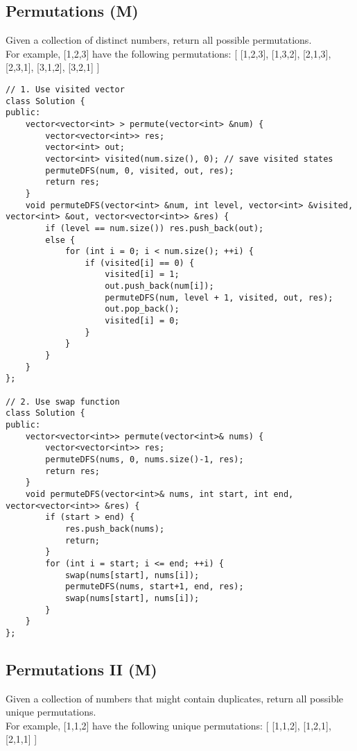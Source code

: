 \subsection{Permutations (M)}
Given a collection of distinct numbers, return all possible permutations. \\

For example,
[1,2,3] have the following permutations: [ [1,2,3], [1,3,2], [2,1,3], [2,3,1], [3,1,2], [3,2,1] ]\\

\begin{lstlisting}
// 1. Use visited vector
class Solution {
public:
    vector<vector<int> > permute(vector<int> &num) {
        vector<vector<int>> res;
        vector<int> out;
        vector<int> visited(num.size(), 0); // save visited states
        permuteDFS(num, 0, visited, out, res);
        return res;
    }
    void permuteDFS(vector<int> &num, int level, vector<int> &visited, vector<int> &out, vector<vector<int>> &res) {
        if (level == num.size()) res.push_back(out);
        else {
            for (int i = 0; i < num.size(); ++i) {
                if (visited[i] == 0) {
                    visited[i] = 1;
                    out.push_back(num[i]);
                    permuteDFS(num, level + 1, visited, out, res);
                    out.pop_back();
                    visited[i] = 0;
                }
            }
        }
    }
};

// 2. Use swap function
class Solution {
public:
    vector<vector<int>> permute(vector<int>& nums) {
        vector<vector<int>> res;
        permuteDFS(nums, 0, nums.size()-1, res);
        return res;
    }
    void permuteDFS(vector<int>& nums, int start, int end, vector<vector<int>> &res) {
        if (start > end) {
            res.push_back(nums);
            return;
        }
        for (int i = start; i <= end; ++i) {
            swap(nums[start], nums[i]);
            permuteDFS(nums, start+1, end, res);
            swap(nums[start], nums[i]);
        }
    }
};
\end{lstlisting}


\subsection{Permutations II (M)}
Given a collection of numbers that might contain duplicates, return all possible unique permutations.\\

For example, [1,1,2] have the following unique permutations:
[
  [1,1,2],
  [1,2,1],
  [2,1,1]
] \\

